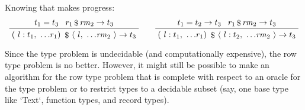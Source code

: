 \documentclass[11pt, twoside, reqno]{book}
\providecommand{\lcurvyangle}{\langle}
\providecommand{\rcurvyangle}{\rangle}
\begin{document}
Knowing that makes progress:
\begin{displaymath}
\prftree{t_1 = t_3}{r_1 \mathop{\$} \mathit{rm}_2 \to t_3}
  {(\ l : t_1,\ \dots\!r_1 )\ \mathop{\$}\ \lcurvyangle\ l,\ \dots\!\mathit{rm}_2\ \rcurvyangle \to t_3}
\qquad
\prftree{t_1 = t_2 \to t_3}{r_1 \mathop{\$} \mathit{rm}_2 \to t_3}
  {(\ l : t_1,\ \dots\!r_1 )\ \mathop{\$}\ \lcurvyangle\ l : t_2,\ \dots\!\mathit{rm}_2\ \rcurvyangle \to t_3}
\end{displaymath}

\iffalse
\begin{verbatim}
apartness rules:

t1 /= t3
mt2 = some t2
( l : t1, ...r1 ) $ (l : t2, ...rm2 ) -> t3
______________________________________________
( l : t1, ...r1 ) $ ( l :? mt2, ...rm2 ) -> t3

t1 /= forall (l : t2) -> t5
mt2 = none
( l : t1, ...r1 ) $ ( l, ...rm2 ) -> t3
______________________________________________
( l : t1, ...r1 ) $ ( l :? mt2, ...rm2 ) -> t3
\end{verbatim}
\fi


%
%
%
%

Since the type problem is undecidable (and computationally expensive), the row type problem is no better.
However, it might still be possible to make an algorithm for the row type problem that is complete with respect to an oracle for the type problem or to restrict types to a decidable subset (say, one base type like \inHS`Text`, function types, and record types).

\begin{displaymath}
\end{displaymath}
\end{document}
